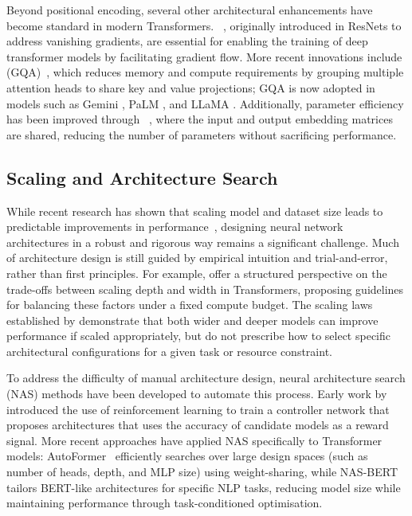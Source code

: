 Beyond positional encoding, several other architectural enhancements have become standard in modern Transformers. ~\citep{he2016deep}, originally introduced in ResNets to address vanishing gradients, are essential for enabling the training of deep transformer models by facilitating gradient flow. More recent innovations include  (GQA)~\citep{ainslie2023gqa}, which reduces memory and compute requirements by grouping multiple attention heads to share key and value projections; GQA is now adopted in models such as Gemini \citep{deepmind2023gemini}, PaLM \citep{chowdhery2023palm}, and LLaMA \citep{touvron2023llama}. Additionally, parameter efficiency has been improved through ~\citep{press2017using}, where the input and output embedding matrices are shared, reducing the number of parameters without sacrificing performance.

\subsection{Scaling and Architecture Search}
While recent research has shown that scaling model and dataset size leads to predictable improvements in performance~\citep{kaplan2020scaling, henighan2020scaling}, designing neural network architectures in a robust and rigorous way remains a significant challenge. Much of architecture design is still guided by empirical intuition and trial-and-error, rather than first principles. For example, \citet{levine2020depth} offer a structured perspective on the trade-offs between scaling depth and width in Transformers, proposing guidelines for balancing these factors under a fixed compute budget. The scaling laws established by \citet{kaplan2020scaling} demonstrate that both wider and deeper models can improve performance if scaled appropriately, but do not prescribe how to select specific architectural configurations for a given task or resource constraint.

To address the difficulty of manual architecture design, neural architecture search (NAS) methods have been developed to automate this process. Early work by \citet{zoph2017neural} introduced the use of reinforcement learning to train a controller network that proposes architectures that uses the accuracy of candidate models as a reward signal. More recent approaches have applied NAS specifically to Transformer models: AutoFormer~\citep{chen2021autoformer} efficiently searches over large design spaces (such as number of heads, depth, and MLP size) using weight-sharing, while NAS-BERT~\citep{xu2021nasbert} tailors BERT-like architectures for specific NLP tasks, reducing model size while maintaining performance through task-conditioned optimisation.

